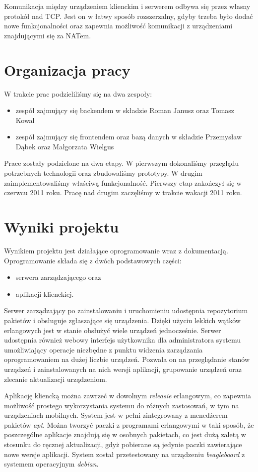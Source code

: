 \documentclass[polish,12pt]{aghthesis}
\begin{document}
Komunikacja między urządzeniem klienckim i serwerem odbywa się przez własny protokół nad TCP. Jest on w łatwy sposób rozszerzalny, gdyby trzeba było dodać nowe funkcjonalności oraz zapewnia możliwość komunikacji z urządzeniami znajdującymi się za NATem.

\section{Organizacja pracy}

W trakcie prac podzieliliśmy się na dwa zespoły:
\begin{itemize}
\item zespół zajmujący się backendem w składzie Roman Janusz oraz Tomasz Kowal
\item zespół zajmujący się frontendem oraz bazą danych w składzie Przemysław Dąbek oraz Małgorzata Wielgus
\end{itemize}

Prace zostały podzielone na dwa etapy. W pierwszym dokonaliśmy przeglądu potrzebnych technologii oraz zbudowaliśmy prototypy. W drugim zaimplementowaliśmy właściwą funkcjonalność.
Pierwszy etap zakończył się w czerwcu 2011 roku. Pracę nad drugim zaczęliśmy w trakcie wakacji 2011 roku.

\section{Wyniki projektu}

Wynikiem projektu jest działające oprogramowanie wraz z dokumentacją. Oprogramowanie składa się z dwóch podstawowych części:
\begin{itemize}
\item serwera zarządzającego oraz
\item aplikacji klienckiej.
\end{itemize}
 Serwer zarządzający po zainstalowaniu i uruchomieniu udostępnia repozytorium pakietów i obsługuje zgłaszające się urządzenia. Dzięki użyciu lekkich wątków erlangowych jest w stanie obsłużyć wiele urządzeń jednocześnie. Serwer udostępnia również webowy interfejs użytkownika dla administratora systemu umożliwiający operacje niezbędne z punktu widzenia zarządzania oprogramowaniem na dużej liczbie urządzeń. Pozwala on na przeglądanie stanów urządzeń i zainstalowanych na nich wersji aplikacji, grupowanie urządzeń oraz zlecanie aktualizacji urządzeniom.

Aplikację kliencką można zawrzeć w dowolnym \emph{releasie} erlangowym, co zapewnia możliwość prostego wykorzystania systemu do różnych zastosowań, w tym na urządzeniach mobilnych. System jest w pełni zintegrowany z menedżerem pakietów \emph{apt}. Można tworzyć paczki z programami erlangowymi w taki sposób, że poszczególne aplikacje znajdują się w osobnych pakietach, co jest dużą zaletą w stosunku do ręcznej aktualizacji, gdyż pobierane są jedynie paczki zawierające nowe wersje aplikacji. System został przetestowany na urządzeniu \emph{beagleboard} z systemem operacyjnym \emph{debian}.
\end{document}
